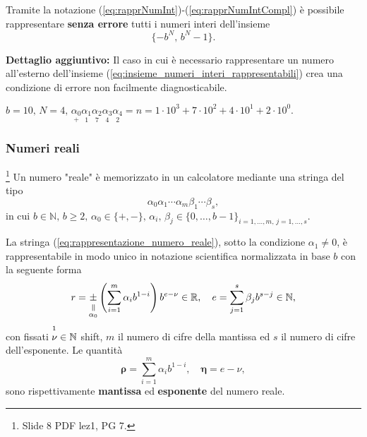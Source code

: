 Tramite la notazione (\ref{eq:rapprNumInt})-(\ref{eq:rapprNumIntCompl}) è possibile rappresentare \textbf{senza errore} tutti i numeri interi dell'insieme
\begin{equation}\label{eq:insieme_numeri_interi_rappresentabili}
	\{-b^N,\,b^N-1\}.
\end{equation}

\textbf{Dettaglio aggiuntivo:} Il caso in cui è necessario rappresentare un numero all'esterno dell'insieme (\ref{eq:insieme_numeri_interi_rappresentabili}) crea una condizione di errore non facilmente diagnosticabile.

\begin{example}
	$b=10,\, N=4,\, \underset{+}{\alpha_0}\underset{1}{\alpha_1}\underset{7}{\alpha_2}\underset{4}{\alpha_3}\underset{2}{\alpha_4}=n=1\cdot 10^3+7\cdot 10^2+4\cdot 10^1+2\cdot 10^0.$
\end{example}

\subsubsection{Numeri reali}\footnote{Slide 8 PDF lez1, PG 7.}
Un numero "reale" è memorizzato in un calcolatore mediante una stringa del tipo
\begin{equation}\label{eq:rappresentazione_numero_reale}
	\alpha_0\alpha_1\cdots\alpha_m\beta_1\cdots\beta_s,
\end{equation}
in cui $b\in\mathbb N,\, b\geq 2,\, \alpha_0\in\{+,-\},\, \alpha_i,\,\beta_j\in\{0,\hdots,b-1\}_{i=1,\hdots,m,\, j=1,\hdots,s}.$
\begin{definition}
	La stringa (\ref{eq:rappresentazione_numero_reale}), sotto la condizione $\alpha_1\neq 0$, è rappresentabile in modo unico in notazione scientifica normalizzata in base $b$ con la seguente forma
	\begin{equation}\label{eq:rappresentazione_scientifica_normalizzata}
		r=\equalto{\pm}{\alpha_0}\left(\sum_{i=1}^m\alpha_ib^{1-i}\right)b^{e-\nu}\in\mathbb{R},\quad e=\sum_{j=1}^s\beta_jb^{s-j}\in\mathbb N,
	\end{equation}
	con fissati $\overset{\footnotemark}{\nu}\in\mathbb N$ shift, $m$ il numero di cifre della mantissa ed $s$ il numero di cifre dell'esponente. Le quantità
	\begin{equation}\label{eq:mantissa_esponente_rappresentazione_numero_reale}
		\boldsymbol\rho = \sum_{i=1}^m\alpha_ib^{1-i},\quad \boldsymbol\eta = e-\nu,
	\end{equation}
	sono rispettivamente \textbf{mantissa} ed \textbf{esponente} del numero reale.
\end{definition}

